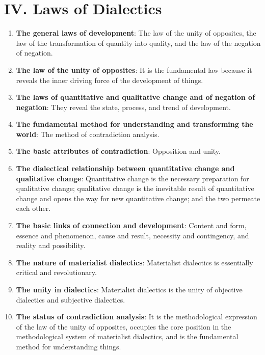\documentclass[12pt,a4paper]{ctexart}
\begin{document}
\section{IV. Laws of Dialectics}

\begin{enumerate}[leftmargin=2em]
    \item \textbf{The general laws of development}: The law of the unity of opposites, the law of the transformation of quantity into quality, and the law of the negation of negation.
    
    \item \textbf{The law of the unity of opposites}: It is the fundamental law because it reveals the inner driving force of the development of things.
    
    \item \textbf{The laws of quantitative and qualitative change and of negation of negation}: They reveal the state, process, and trend of development.
    
    \item \textbf{The fundamental method for understanding and transforming the world}: The method of contradiction analysis.
    
    \item \textbf{The basic attributes of contradiction}: Opposition and unity.
    
    \item \textbf{The dialectical relationship between quantitative change and qualitative change}: Quantitative change is the necessary preparation for qualitative change; qualitative change is the inevitable result of quantitative change and opens the way for new quantitative change; and the two permeate each other.
    
    \item \textbf{The basic links of connection and development}: Content and form, essence and phenomenon, cause and result, necessity and contingency, and reality and possibility.
    
    \item \textbf{The nature of materialist dialectics}: Materialist dialectics is essentially critical and revolutionary.
    
    \item \textbf{The unity in dialectics}: Materialist dialectics is the unity of objective dialectics and subjective dialectics.
    
    \item \textbf{The status of contradiction analysis}: It is the methodological expression of the law of the unity of opposites, occupies the core position in the methodological system of materialist dialectics, and is the fundamental method for understanding things.
    

\end{enumerate}
\end{document}
